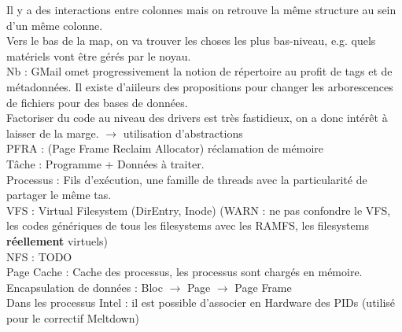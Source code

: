 Il y a des interactions entre colonnes mais on retrouve la même structure au sein
d'un même colonne.\\
Vers le bas de la map, on va trouver les choses les plus bas-niveau, e.g. quels
matériels vont être gérés par le noyau.\\
Nb : GMail omet progressivement la notion de répertoire au profit de tags et de
métadonnées. Il existe d'aiileurs des propositions pour changer les arborescences
de fichiers pour des bases de données.\\
Factoriser du code au niveau des drivers est très fastidieux, on a donc intérêt à
laisser de la marge. $\rightarrow$ utilisation d'abstractions\\
PFRA : (Page Frame Reclaim Allocator) réclamation de mémoire\\
Tâche : Programme + Données à traiter.\\
Processus : Fils d'exécution, une famille de threads avec la particularité de
partager le même tas.\\
VFS : Virtual Filesystem (DirEntry, Inode) (WARN : ne pas confondre le VFS, les
codes génériques de tous les filesystems avec les RAMFS, les filesystems
{\bf réellement} virtuels)\\
NFS : TODO \\
Page Cache : Cache des processus, les processus sont chargés en mémoire.\\
Encapsulation de données : Bloc $\rightarrow$ Page $\rightarrow$ Page Frame\\
Dans les processus Intel : il est possible d'associer en Hardware des PIDs (utilisé
pour le correctif Meltdown)
